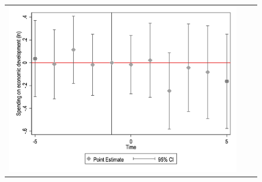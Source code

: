 \begin{figure}[ht]
\begin{tabular}{@{}ccc@{}}
\begin{minipage}[t]{0.32\textwidth}
            \includegraphics[width=\linewidth]{images/pop_5000/eventdd_ln_q4_11_step1.jpg}
            \label{fig:ecodev}
        \end{minipage} \\[10pt]


\end{tabular}
\end{figure}
